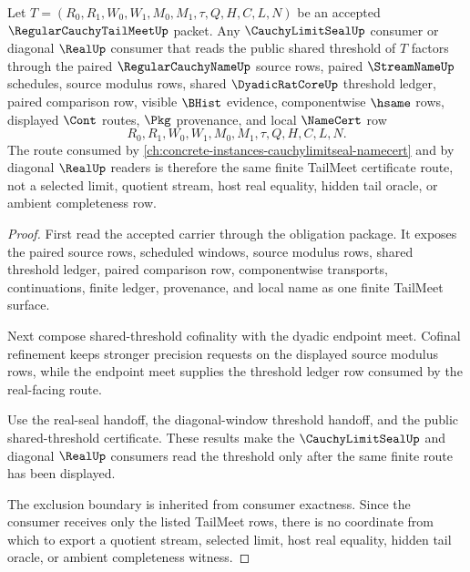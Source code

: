 \begin{theorem}
\label{thm:regular-cauchy-tail-meet-limit-seal-threshold-route}
Let $T=(R_0,R_1,W_0,W_1,M_0,M_1,\tau,Q,H,C,L,N)$ be an accepted $\RegularCauchyTailMeetUp$ packet. Any $\CauchyLimitSealUp$ consumer or diagonal $\RealUp$ consumer that reads the public shared threshold of $T$ factors through the paired $\RegularCauchyNameUp$ source rows, paired $\StreamNameUp$ schedules, source modulus rows, shared $\DyadicRatCoreUp$ threshold ledger, paired comparison row, visible $\BHist$ evidence, componentwise $\hsame$ rows, displayed $\Cont$ routes, $\Pkg$ provenance, and local $\NameCert$ row
$$
R_0,R_1,W_0,W_1,M_0,M_1,\tau,Q,H,C,L,N.
$$
The route consumed by \autoref{ch:concrete-instances-cauchylimitseal-namecert} and by diagonal $\RealUp$ readers is therefore the same finite TailMeet certificate route, not a selected limit, quotient stream, host real equality, hidden tail oracle, or ambient completeness row.
\end{theorem}
\begin{proof}
First read the accepted carrier through the obligation package. It exposes the paired source rows, scheduled windows, source modulus rows, shared threshold ledger, paired comparison row, componentwise transports, continuations, finite ledger, provenance, and local name as one finite TailMeet surface.

Next compose shared-threshold cofinality with the dyadic endpoint meet. Cofinal refinement keeps stronger precision requests on the displayed source modulus rows, while the endpoint meet supplies the threshold ledger row consumed by the real-facing route.

Use the real-seal handoff, the diagonal-window threshold handoff, and the public shared-threshold certificate. These results make the $\CauchyLimitSealUp$ and diagonal $\RealUp$ consumers read the threshold only after the same finite route has been displayed.

The exclusion boundary is inherited from consumer exactness. Since the consumer receives only the listed TailMeet rows, there is no coordinate from which to export a quotient stream, selected limit, host real equality, hidden tail oracle, or ambient completeness witness.
\end{proof}

